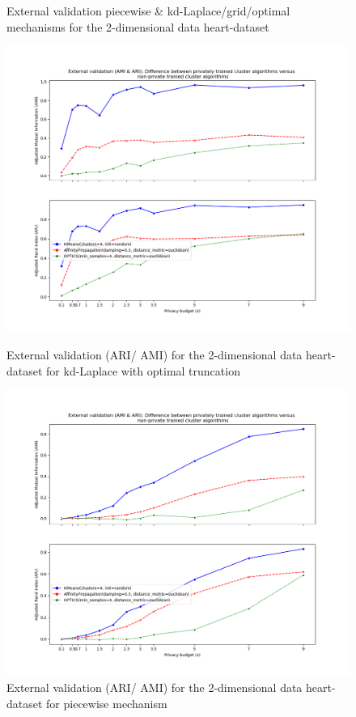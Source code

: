 \begin{figure}[H]
    \caption{External validation piecewise \& kd-Laplace/grid/optimal mechanisms for the 2-dimensional data heart-dataset}
    \centering
    \begin{minipage}[c]{0.49\textwidth}
        \includegraphics[width=1\textwidth]{Results/2d-laplace-optimal-truncated/heart-dataset/ami-and-ari.png}
        \caption{External validation (ARI/ AMI) for the 2-dimensional data heart-dataset for kd-Laplace with optimal truncation}
        \label{fig:external-validation-heart-dataset_comparison_2d-laplace}
    \end{minipage}
    \begin{minipage}[c]{0.49\textwidth}
        \includegraphics[width=1\textwidth]{Results/2d-piecewise/heart-dataset/ami-and-ari.png}
        \caption{External validation (ARI/ AMI) for the 2-dimensional data heart-dataset for piecewise mechanism}
        \label{fig:external-validation-heart-dataset_comparison_2d-piecewise}
    \end{minipage}
\end{figure}
